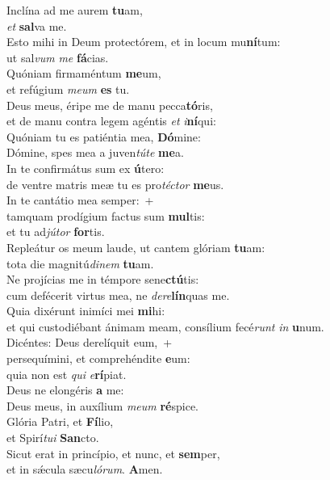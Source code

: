 \evenverse Inclína ad me aurem \textbf{tu}am,~\*\\
\evenverse \textit{et} \textbf{sal}va me.\\
\oddverse Esto mihi in Deum protectórem, et in locum mu\textbf{ní}tum:~\*\\
\oddverse ut sal\textit{vum} \textit{me} \textbf{fá}cias.\\
\evenverse Quóniam firmaméntum \textbf{me}um,~\*\\
\evenverse et refúgium \textit{me}\textit{um} \textbf{es} tu.\\
\oddverse Deus meus, éripe me de manu pecca\textbf{tó}ris,~\*\\
\oddverse et de manu contra legem agéntis \textit{et} \textit{i}\textbf{ní}qui:\\
\evenverse Quóniam tu es patiéntia mea, \textbf{Dó}mine:~\*\\
\evenverse Dómine, spes mea a juven\textit{tú}\textit{te} \textbf{me}a.\\
\oddverse In te confirmátus sum ex \textbf{ú}tero:~\*\\
\oddverse de ventre matris meæ tu es pro\textit{té}\textit{ctor} \textbf{me}us.\\
\evenverse In te cantátio mea semper:~+\\
\evenverse  tamquam prodígium factus sum \textbf{mul}tis:~\*\\
\evenverse et tu ad\textit{jú}\textit{tor} \textbf{for}tis.\\
\oddverse Repleátur os meum laude, ut cantem glóriam \textbf{tu}am:~\*\\
\oddverse tota die magnitú\textit{di}\textit{nem} \textbf{tu}am.\\
\evenverse Ne projícias me in témpore sene\textbf{ctú}tis:~\*\\
\evenverse cum defécerit virtus mea, ne \textit{de}\textit{re}\textbf{lín}quas me.\\
\oddverse Quia dixérunt inimíci mei \textbf{mi}hi:~\*\\
\oddverse et qui custodiébant ánimam meam, consílium fecé\textit{runt} \textit{in} \textbf{u}num.\\
\evenverse Dicéntes: Deus derelíquit eum,~+\\
\evenverse  persequímini, et comprehéndite \textbf{e}um:~\*\\
\evenverse quia non est \textit{qui} \textit{e}\textbf{rí}piat.\\
\oddverse Deus ne elongéris \textbf{a} me:~\*\\
\oddverse Deus meus, in auxílium \textit{me}\textit{um} \textbf{ré}spice.\\
\evenverse Glória Patri, et \textbf{Fí}lio,~\*\\
\evenverse et Spirí\textit{tu}\textit{i} \textbf{San}cto.\\
\oddverse Sicut erat in princípio, et nunc, et \textbf{sem}per,~\*\\
\oddverse et in sǽcula sæcu\textit{ló}\textit{rum}. \textbf{A}men.\\
